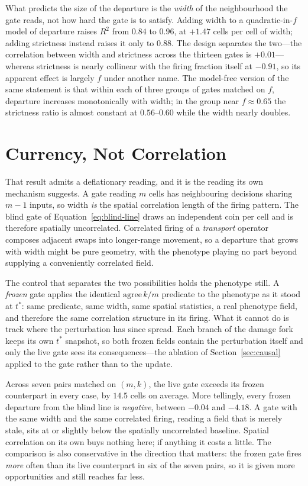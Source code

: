 \documentclass[man,12pt,floatsintext,donotrepeattitle]{apa7}
\begin{document}
What predicts the size of the departure is the \emph{width} of the neighbourhood
the gate reads, not how hard the gate is to satisfy. Adding width to a
quadratic-in-$f$ model of departure raises $R^{2}$ from $0.84$ to $0.96$, at
$+1.47$ cells per cell of width; adding strictness instead raises it only to
$0.88$. The design separates the two---the correlation between width and
strictness across the thirteen gates is $+0.01$---whereas strictness is nearly
collinear with the firing fraction itself at $-0.91$, so its apparent effect is
largely $f$ under another name. The model-free version of the same statement is
that within each of three groups of gates matched on $f$, departure increases
monotonically with width; in the group near $f \approx 0.65$ the strictness ratio
is almost constant at $0.56$--$0.60$ while the width nearly doubles.

\section{Currency, Not Correlation}
\label{sec:currency}

That result admits a deflationary reading, and it is the reading its own
mechanism suggests. A gate reading $m$ cells has neighbouring decisions sharing
$m-1$ inputs, so width \emph{is} the spatial correlation length of the firing
pattern. The blind gate of Equation~\ref{eq:blind-line} draws an independent coin
per cell and is therefore spatially uncorrelated. Correlated firing of a
\emph{transport} operator composes adjacent swaps into longer-range movement, so
a departure that grows with width might be pure geometry, with the phenotype
playing no part beyond supplying a conveniently correlated field.

The control that separates the two possibilities holds the phenotype still. A
\emph{frozen} gate applies the identical $\mathrm{agree}\,k/m$ predicate to the
phenotype as it stood at $t^{*}$: same predicate, same width, same spatial
statistics, a real phenotype field, and therefore the same correlation structure
in its firing. What it cannot do is track where the perturbation has since
spread. Each branch of the damage fork keeps its own $t^{*}$ snapshot, so both
frozen fields contain the perturbation itself and only the live gate sees its
consequences---the ablation of Section~\ref{sec:causal} applied to the
gate rather than to the update.

Across seven pairs matched on $(m,k)$, the live gate exceeds its frozen
counterpart in every case, by $14.5$ cells on average. More tellingly, every
frozen departure from the blind line is \emph{negative}, between $-0.04$ and
$-4.18$. A gate with the same width and the same correlated firing, reading a
field that is merely stale, sits at or slightly below the spatially uncorrelated
baseline. Spatial correlation on its own buys nothing here; if anything it costs
a little. The comparison is also conservative in the direction that matters: the
frozen gate fires \emph{more} often than its live counterpart in six of the seven
pairs, so it is given more opportunities and still reaches far less.
\end{document}
